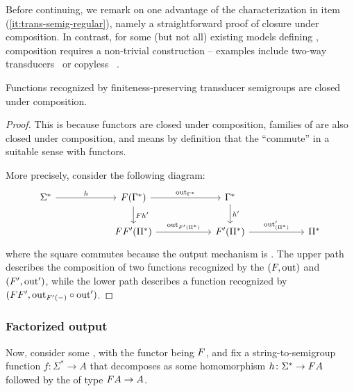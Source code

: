 Before continuing, we remark on one advantage of the characterization in item
(\ref{it:trans-semig-regular}), namely a straightforward proof of closure under
composition. In contrast, for some (but not all) existing models defining
, composition requires a non-trivial
construction -- examples include two-way transducers~\cite[Theorem 2]{ChytilJ77}
or copyless ~\cite[Theorem 1]{composingSST}.
\begin{proposition}\label{prop:composition}
  Functions recognized by finiteness-preserving transducer semigroups are closed
  under composition.
\end{proposition}
\begin{proof}
  This is because  functors are closed under composition,
   families of  are also closed under composition, and 
  means by definition that the  \enquote{commute} in a suitable
  sense with functors.

  More precisely, consider the following diagram:
    \[
      \begin{tikzcd}[ampersand replacement=\&, column sep=2cm]
        \Sigma^* 
        \ar[r,"h"]
        \& 
        \functor(\Gamma^*)
        \ar[r,"\outfun_{\Gamma^*}"]
        \ar[d,"\functor h'"]
        \&
        \Gamma^* \ar[d,"h'"]\\
        \&
        \functor\functor'(\Pi^*) \ar[r,"\outfun_{\functor'(\Pi^*)}"]
        \& 
        \functor'(\Pi^*)
        \ar[r,"\outfun'_{(\Pi^*)}"]
        \&
        \Pi^*
      \end{tikzcd}
  \]
  where the square commutes because the output mechanism is . The upper path describes the composition of two functions recognized by the
   $(\functor,\outfun)$ and $(\functor',\outfun')$,
  while the lower path describes a function recognized by $(\functor\functor',
  \outfun_{\functor'(-)} \circ \outfun')$.
\end{proof}





\subsubsection{Factorized output}
Now, consider some , with the functor being $\functor$, and fix a string-to-semigroup function $f\colon \Sigma^* \to A$ that decomposes as some homomorphism $h\colon \Sigma^* \to \functor A$ followed by the  of type $\functor A \to A$. 

